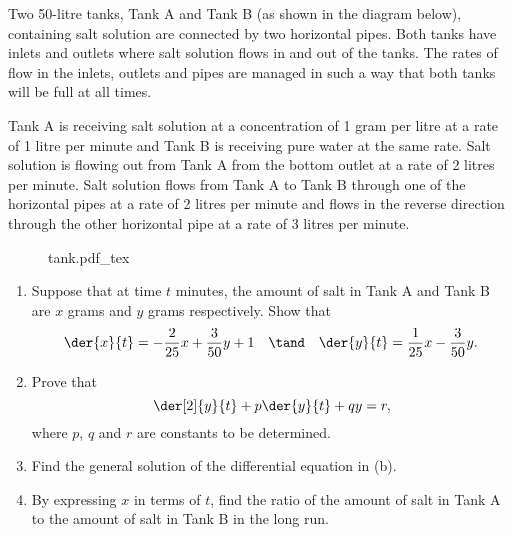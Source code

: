 \begin{problem}
    Two 50-litre tanks, Tank A and Tank B (as shown in the diagram below), containing salt solution are connected by two horizontal pipes. Both tanks have inlets and outlets where salt solution flows in and out of the tanks. The rates of flow in the inlets, outlets and pipes are managed in such a way that both tanks will be full at all times.

    Tank A is receiving salt solution at a concentration of 1 gram per litre at a rate of 1 litre per minute and Tank B is receiving pure water at the same rate. Salt solution is flowing out from Tank A from the bottom outlet at a rate of 2 litres per minute. Salt solution flows from Tank A to Tank B through one of the horizontal pipes at a rate of 2 litres per minute and flows in the reverse direction through the other horizontal pipe at a rate of 3 litres per minute.

    \begin{figure}[H]
        \centering
        {tank.pdf_tex}
    \end{figure}

    \begin{enumerate}
        \item Suppose that at time $t$ minutes, the amount of salt in Tank A and Tank B are $x$ grams and $y$ grams respectively. Show that \[\der{x}{t} = -\frac2{25} x + \frac3{50} y + 1 \quad \tand \quad \der{y}{t} = \frac1{25} x - \frac3{50} y.\]
        \item Prove that \[\der[2]{y}{t} + p \der{y}{t} + qy = r,\] where $p$, $q$ and $r$ are constants to be determined.
        \item Find the general solution of the differential equation in (b).
        \item By expressing $x$ in terms of $t$, find the ratio of the amount of salt in Tank A to the amount of salt in Tank B in the long run.
    \end{enumerate}
\end{problem}


